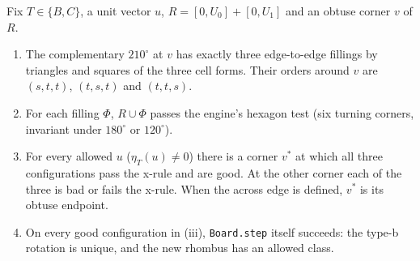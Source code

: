 \documentclass[11pt]{article}
\theoremstyle{definition}\newtheorem{definition}[theorem]{Definition}\newtheorem{remark}[theorem]{Remark}
\begin{document}
\begin{lemma}\label{lem:fan}
Fix $T\in\{B,C\}$, a unit vector $u$, $R=[0,U_0]+[0,U_1]$ and an obtuse corner $v$ of $R$.
\begin{enumerate}
\item[(i)] The complementary $210^\circ$ at $v$ has exactly three edge-to-edge fillings by triangles and squares of the three cell forms. Their orders around $v$ are $(s,t,t)$, $(t,s,t)$ and $(t,t,s)$.
\item[(ii)] For each filling $\Phi$, $R\cup\Phi$ passes the engine's hexagon test (six turning corners, invariant under $180^\circ$ or $120^\circ$).
\item[(iii)] For every allowed $u$ ($\eta_T(u)\ne0$) there is a corner $v^*$ at which all three configurations pass the x-rule and are good. At the other corner each of the three is bad or fails the x-rule. When the across edge is defined, $v^*$ is its obtuse endpoint.
\item[(iv)] On every good configuration in (iii), \texttt{Board.step} itself succeeds: the type-b rotation is unique, and the new rhombus has an allowed class.
\end{enumerate}
\end{lemma}
\end{document}
